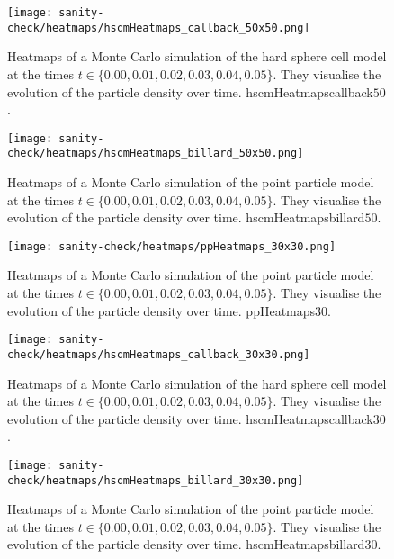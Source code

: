 \begin{figure}[h]
	\centering
    \texttt{[image: sanity-check/heatmaps/hscmHeatmaps\_callback\_50x50.png]}
    \caption{Heatmaps of a Monte Carlo simulation of the hard sphere cell model at the times $t \in \{0.00, 0.01, 0.02, 0.03, 0.04, 0.05\}$. 
    They visualise the evolution of the particle density over time. 
    hscmHeatmapscallback$50$.
    }
\end{figure}


\begin{figure}[h]
	\centering
    \texttt{[image: sanity-check/heatmaps/hscmHeatmaps\_billard\_50x50.png]}
    \caption{Heatmaps of a Monte Carlo simulation of the point particle model at the times $t \in \{0.00, 0.01, 0.02, 0.03, 0.04, 0.05\}$. 
    They visualise the evolution of the particle density over time. 
    hscmHeatmapsbillard$50$.
    }
\end{figure}




\begin{figure}[h]
	\centering
    \texttt{[image: sanity-check/heatmaps/ppHeatmaps\_30x30.png]}
    \caption{Heatmaps of a Monte Carlo simulation of the point particle model at the times $t \in \{0.00, 0.01, 0.02, 0.03, 0.04, 0.05\}$. 
    They visualise the evolution of the particle density over time. 
    ppHeatmaps$30$. 
    }
\end{figure}

\begin{figure}[h]
	\centering
    \texttt{[image: sanity-check/heatmaps/hscmHeatmaps\_callback\_30x30.png]}
    \caption{Heatmaps of a Monte Carlo simulation of the hard sphere cell model at the times $t \in \{0.00, 0.01, 0.02, 0.03, 0.04, 0.05\}$. 
    They visualise the evolution of the particle density over time. 
    hscmHeatmapscallback$30$.
    }
\end{figure}


\begin{figure}[h]
	\centering
    \texttt{[image: sanity-check/heatmaps/hscmHeatmaps\_billard\_30x30.png]}
    \caption{Heatmaps of a Monte Carlo simulation of the point particle model at the times $t \in \{0.00, 0.01, 0.02, 0.03, 0.04, 0.05\}$. 
    They visualise the evolution of the particle density over time. 
    hscmHeatmapsbillard$30$.
    }
\end{figure}